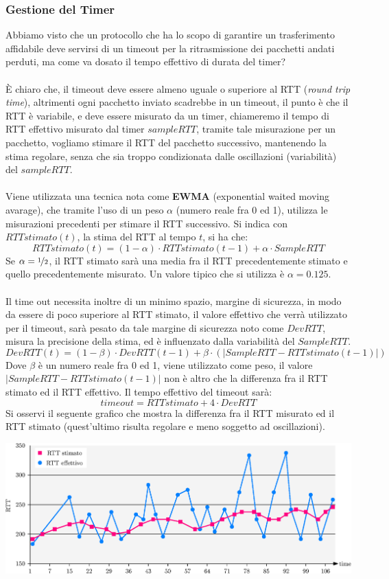 \documentclass[12pt, letterpaper]{article}
\newcommand{\acc}{\\\hphantom{}\\}
\begin{document}
\subsubsection{Gestione del Timer}
Abbiamo visto che un protocollo che ha lo scopo di garantire un trasferimento affidabile deve servirsi di un timeout 
per la ritrasmissione dei pacchetti andati perduti, ma come va dosato il tempo effettivo di durata del timer?\acc 
È chiaro che, il timeout deve essere almeno uguale o superiore al RTT (\textit{round trip time}), altrimenti ogni pacchetto 
inviato scadrebbe in un timeout, il punto è che il RTT è variabile, e deve essere misurato da un timer, chiameremo 
il tempo di RTT effettivo misurato dal timer $sampleRTT$, tramite tale misurazione per un pacchetto,
 vogliamo stimare il RTT del pacchetto successivo, mantenendo la stima regolare, senza che sia troppo condizionata dalle 
 oscillazioni (variabilità) del $sampleRTT$.\acc 
 Viene utilizzata una tecnica nota come \textbf{EWMA} (exponential waited moving avarage), che tramite l'uso di un 
 peso $\alpha$ (numero reale fra 0 ed 1), utilizza le misurazioni precedenti per stimare il RTT successivo. Si indica con 
 $RTTstimato(t)$, la stima del RTT al tempo $t$, si ha che:
 $$ RTTstimato(t) = (1-\alpha)\cdot RTTstimato(t-1)+\alpha \cdot SampleRTT$$
 Se $\alpha = \nicefrac{1}{2}$, il RTT stimato sarà una media fra il RTT precedentemente stimato e quello 
 precedentemente misurato. Un valore tipico che si utilizza è $\alpha=0.125$.\acc 
 Il time out necessita inoltre di un minimo spazio, margine di sicurezza, in modo da essere di poco superiore 
 al RTT stimato, il valore effettivo che verrà utilizzato per il timeout, sarà pesato da tale margine di sicurezza 
 noto come $DevRTT$, misura la precisione della stima, ed è influenzato dalla variabilità del $SampleRTT$.
 $$ DevRTT(t) = (1-\beta)\cdot DevRTT(t-1) + \beta\cdot(|SampleRTT-RTTstimato(t-1)|) $$
 Dove $\beta$ è un numero reale fra 0 ed 1, viene utilizzato come peso, il valore 
 $|SampleRTT-RTTstimato(t-1)|$ non è altro che la differenza fra il RTT stimato ed il 
 RTT effettivo. Il tempo effettivo del timeout sarà:
 $$ timeout=RTTstimato+4\cdot DevRTT$$
 Si osservi il seguente grafico che mostra la differenza fra il RTT misurato ed il RTT stimato (quest'ultimo risulta 
 regolare e meno soggetto ad oscillazioni).\begin{center}
    \includegraphics[width=\textwidth ]{images/RTTstimato.eps}
\end{center} 
\end{document}
